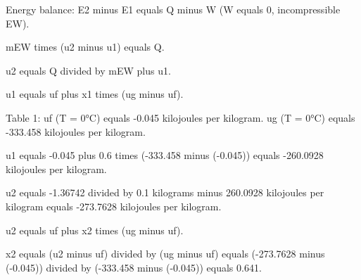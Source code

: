 Energy balance:  
E2 minus E1 equals Q minus W (W equals 0, incompressible EW).  

mEW times (u2 minus u1) equals Q.  

u2 equals Q divided by mEW plus u1.  

u1 equals uf plus x1 times (ug minus uf).  

Table 1:  
uf (T = 0°C) equals -0.045 kilojoules per kilogram.  
ug (T = 0°C) equals -333.458 kilojoules per kilogram.  

u1 equals -0.045 plus 0.6 times (-333.458 minus (-0.045))  
equals -260.0928 kilojoules per kilogram.  

u2 equals -1.36742 divided by 0.1 kilograms minus 260.0928 kilojoules per kilogram  
equals -273.7628 kilojoules per kilogram.  

u2 equals uf plus x2 times (ug minus uf).  

x2 equals (u2 minus uf) divided by (ug minus uf)  
equals (-273.7628 minus (-0.045)) divided by (-333.458 minus (-0.045))  
equals 0.641.